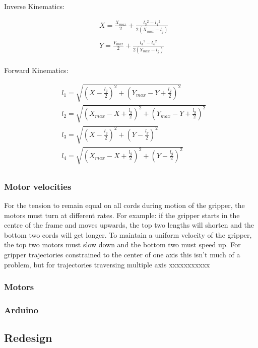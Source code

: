 \documentclass[conference]{IEEEtran}
\begin{document}
Inverse Kinematics:

\begin{equation}
\begin{aligned}
&X = \frac{X_{max}}{2} + \frac{l_3{}^2 - l_4{}^2}{2\left(X_{max} - l_g\right)}\\ \\
&Y = \frac{Y_{max}}{2} + \frac{l_3{}^2 - l_4{}^2}{2\left(Y_{max} - l_g\right)}\\
\end{aligned}
\end{equation}

Forward Kinematics:

\begin{equation}
\begin{aligned}
&l_1 = \sqrt{\left(X - \frac{l_g}{2}\right)^2 + \left(Y_{max}-Y+\frac{l_g}{2}\right)^2}\\
&l_2 = \sqrt{\left(X_{max}-X+\frac{l_g}{2}\right)^2 + \left(Y_{max}-Y+\frac{l_g}{2}\right)^2}\\
&l_3 = \sqrt{\left(X-\frac{l_g}{2}\right)^2 + \left(Y-\frac{l_g}{2}\right)^2}\\
&l_4 = \sqrt{\left(X_{max}-X+\frac{l_g}{2}\right)^2 + \left(Y-\frac{l_g}{2}\right)^2}\\
\end{aligned}
\end{equation}
\subsubsection{Motor velocities}\label{motor_vel_problem}
For the tension to remain equal on all cords during motion of the gripper, the motors must turn at different rates. For example: if the gripper starts in the centre of the frame and moves upwards, the top two lengths will shorten and the bottom two cords will get longer. To maintain a uniform velocity of the gripper, the top two motors must slow down and the bottom two must speed up. For gripper trajectories constrained to the center of one axis this isn't much of a problem, but for trajectories traversing multiple axis xxxxxxxxxxx
\subsubsection{Motors}
\subsubsection{Arduino}
\subsection{Redesign}
\end{document}
